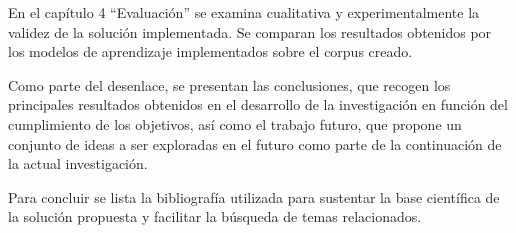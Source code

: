 En el capítulo 4 “Evaluación” se examina cualitativa y experimentalmente la validez de la solución implementada. Se comparan los resultados obtenidos por los modelos de aprendizaje implementados sobre el corpus creado.

Como parte del desenlace, se presentan las conclusiones, que recogen los principales resultados obtenidos en el desarrollo de la investigación en función del cumplimiento de los objetivos, así como el trabajo futuro, que propone un conjunto de ideas a ser exploradas en el futuro como parte de la continuación de la actual investigación.

Para concluir se lista la bibliografía utilizada para sustentar la base científica de la solución propuesta y facilitar la búsqueda de temas relacionados.

